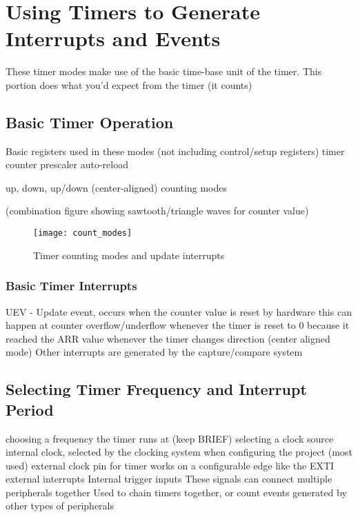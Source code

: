 \documentclass[11pt,fleqn]{book} %
\begin{document}
\section{Using Timers to Generate Interrupts and Events}
    These timer modes make use of the basic time-base unit of the timer. 
    This portion does what you'd expect from the timer (it counts)
    
    \subsection{Basic Timer Operation}
    
    Basic registers used in these modes (not including control/setup registers)
        timer counter
        prescaler 
        auto-reload
    
    up, down, up/down (center-aligned) counting modes
    
    (combination figure showing sawtooth/triangle waves for counter value)
    \begin{figure}[]
        \centering\texttt{[image: count\_modes]}
        \caption{Timer counting modes and update interrupts}
        \label{count_modes}
    \end{figure}
    
    \subsubsection{Basic Timer Interrupts}
    UEV - Update event, occurs when the counter value is reset by hardware
        this can happen at counter overflow/underflow
        whenever the timer is reset to 0 because it reached the ARR value
        whenever the timer changes direction (center aligned mode)
    Other interrupts are generated by the capture/compare system
    
    \subsection{Selecting Timer Frequency and Interrupt Period}	
    choosing a frequency the timer runs at (keep BRIEF)
    selecting a clock source
        internal clock, selected by the clocking system when configuring the project (most used)
        external clock pin for timer
            works on a configurable edge like the EXTI external interrupts
        Internal trigger inputs
            These signals can connect multiple peripherals together
            Used to chain timers together, or count events generated by other types of peripherals
    
\end{document}
